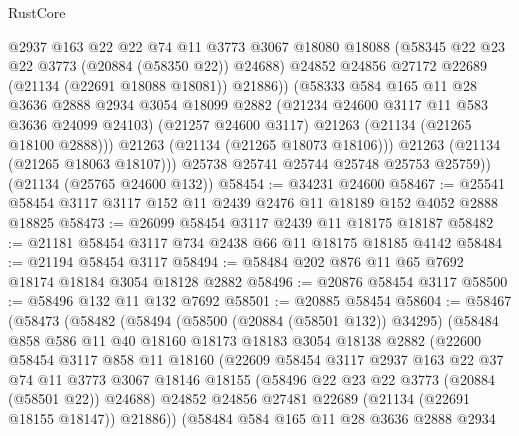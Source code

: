 \begin{lexlean}{RustCore}
\begin{coremodule}
                @2937
                @163
                @22
                @22
                @74
                @11
                @3773
                @3067
                @18080
                @18088
                (@58345 @22 @23 @22 @3773 (@20884 (@58350 @22)) @24688)
                @24852
                @24856
                @27172
                @22689
                (@21134 (@22691 @18088 @18081))
                @21886))
            (@58333
              @584
              @165
              @11
              @28
              @3636
              @2888
              @2934
              @3054
              @18099
              @2882
              (@21234 @24600 @3117 @11 @583 @3636 @24099 @24103)
              (@21257 @24600 @3117)
              @21263
              (@21134 (@21265 @18100 @2888)))
            @21263
            (@21134 (@21265 @18073 @18106)))
          @21263
          (@21134 (@21265 @18063 @18107)))
        @25738
        @25741
        @25744
        @25748
        @25753
        @25759))
    (@21134 (@25765 @24600 @132))
@58454 := @34231 @24600
@58467 := @25541 @58454 @3117 @3117 @152 @11 @2439 @2476 @11 @18189 @152 @4052 @2888 @18825
@58473 := @26099 @58454 @3117 @2439 @11 @18175 @18187
@58482 := @21181 @58454 @3117 @734 @2438 @66 @11 @18175 @18185 @4142
@58484 := @21194 @58454 @3117
@58494 := @58484 @202 @876 @11 @65 @7692 @18174 @18184 @3054 @18128 @2882
@58496 := @20876 @58454 @3117
@58500 := @58496 @132 @11 @132 @7692
@58501 := @20885 @58454
@58604 := @58467
    (@58473
      (@58482
        (@58494
          (@58500 (@20884 (@58501 @132)) @34295)
          (@58484
            @858
            @586
            @11
            @40
            @18160
            @18173
            @18183
            @3054
            @18138
            @2882
            (@22600
              @58454
              @3117
              @858
              @11
              @18160
              (@22609
                @58454
                @3117
                @2937
                @163
                @22
                @37
                @74
                @11
                @3773
                @3067
                @18146
                @18155
                (@58496 @22 @23 @22 @3773 (@20884 (@58501 @22)) @24688)
                @24852
                @24856
                @27481
                @22689
                (@21134 (@22691 @18155 @18147))
                @21886))
            (@58484
              @584
              @165
              @11
              @28
              @3636
              @2888
              @2934

\end{coremodule}
\end{lexlean}
